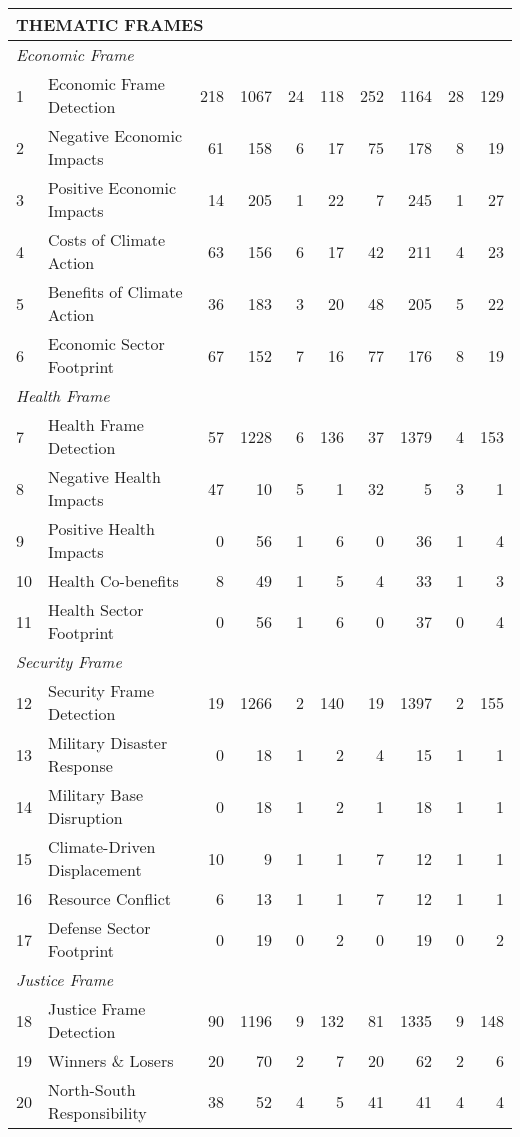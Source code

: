 \documentclass[12pt]{article}
\begin{document}
{\begin{longtable}{p{0.5cm}p{5.5cm}rrrrrrrr}
\multicolumn{10}{l}{\cellcolor{gray!10}\textbf{THEMATIC FRAMES}} \\
\midrule
\multicolumn{10}{l}{\textit{Economic Frame}} \\
1 & Economic Frame Detection & 218 & 1067 & 24 & 118 & 252 & 1164 & 28 & 129 \\
2 & Negative Economic Impacts & 61 & 158 & 6 & 17 & 75 & 178 & 8 & 19 \\
3 & Positive Economic Impacts & 14 & 205 & 1 & 22 & 7 & 245 & 1 & 27 \\
4 & Costs of Climate Action & 63 & 156 & 6 & 17 & 42 & 211 & 4 & 23 \\
5 & Benefits of Climate Action & 36 & 183 & 3 & 20 & 48 & 205 & 5 & 22 \\
6 & Economic Sector Footprint & 67 & 152 & 7 & 16 & 77 & 176 & 8 & 19 \\
\multicolumn{10}{l}{\textit{Health Frame}} \\
7 & Health Frame Detection & 57 & 1228 & 6 & 136 & 37 & 1379 & 4 & 153 \\
8 & Negative Health Impacts & 47 & 10 & 5 & 1 & 32 & 5 & 3 & 1 \\
9 & Positive Health Impacts & 0 & 56 & 1 & 6 & 0 & 36 & 1 & 4 \\
10 & Health Co-benefits & 8 & 49 & 1 & 5 & 4 & 33 & 1 & 3 \\
11 & Health Sector Footprint & 0 & 56 & 1 & 6 & 0 & 37 & 0 & 4 \\
\multicolumn{10}{l}{\textit{Security Frame}} \\
12 & Security Frame Detection & 19 & 1266 & 2 & 140 & 19 & 1397 & 2 & 155 \\
13 & Military Disaster Response & 0 & 18 & 1 & 2 & 4 & 15 & 1 & 1 \\
14 & Military Base Disruption & 0 & 18 & 1 & 2 & 1 & 18 & 1 & 1 \\
15 & Climate-Driven Displacement & 10 & 9 & 1 & 1 & 7 & 12 & 1 & 1 \\
16 & Resource Conflict & 6 & 13 & 1 & 1 & 7 & 12 & 1 & 1 \\
17 & Defense Sector Footprint & 0 & 19 & 0 & 2 & 0 & 19 & 0 & 2 \\
\multicolumn{10}{l}{\textit{Justice Frame}} \\
18 & Justice Frame Detection & 90 & 1196 & 9 & 132 & 81 & 1335 & 9 & 148 \\
19 & Winners \& Losers & 20 & 70 & 2 & 7 & 20 & 62 & 2 & 6 \\
20 & North-South Responsibility & 38 & 52 & 4 & 5 & 41 & 41 & 4 & 4 \\

\end{longtable}}
\end{document}

